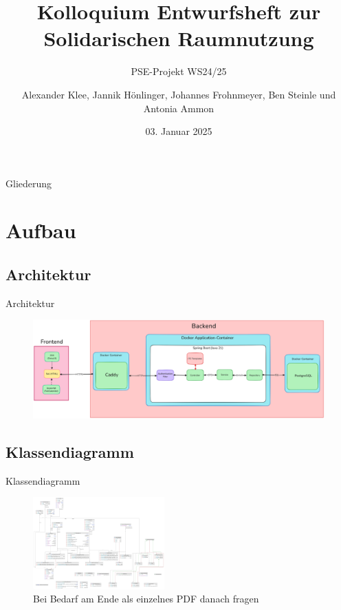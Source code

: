 \documentclass{sdqbeamer}
\title[Solidarische Raumnutzung Entwurfsheft]{Kolloquium Entwurfsheft zur Solidarischen Raumnutzung}
\author[Soli-Gruppe]{Alexander Klee, Jannik Hönlinger, Johannes Frohnmeyer, Ben Steinle und Antonia Ammon }
\subtitle{PSE-Projekt WS24/25}
\date[03.\,01.\,2025]{03. Januar 2025}
\begin{document}
 
\KITtitleframe

\begin{frame}{Gliederung}
\tableofcontents
\end{frame}

\section{Aufbau}

\subsection{Architektur}

\begin{frame}{Architektur}
\begin{figure}
    \centering
    \includegraphics[width=\textwidth]{pictures/figures/architecture}
    \label{fig:architektur}
\end{figure}
\end{frame}

\subsection{Klassendiagramm}

\begin{frame}{Klassendiagramm}
    \begin{figure}
        \centering
        \includegraphics[width=0.45\textwidth]{pictures/figures/classes}
        \caption{Bei Bedarf am Ende als einzelnes PDF danach fragen}
        \label{fig:klassendiagramm}
    \end{figure}
\end{frame}
\end{document}
